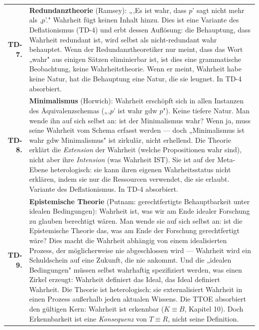 \documentclass[10pt, openany, oneside]{book}
\renewcommand{\footnotesize}{\fontsize{8.5}{11}\selectfont}
\begin{document}
{\footnotesize
\noindent\begin{tabular}{r p{}}
\textbf{TD-7.} & \textbf{Redundanztheorie} (Ramsey): „‚Es ist wahr, dass $p$' sagt nicht mehr als ‚$p$'." Wahrheit fügt keinen Inhalt hinzu. Dies ist eine Variante des Deflationismus (TD-4) und erbt dessen Auflösung: die Behauptung, dass Wahrheit redundant ist, wird selbst als nicht-redundant wahr behauptet. Wenn der Redundanztheoretiker nur meint, dass das Wort „wahr" aus einigen Sätzen eliminierbar ist, ist dies eine grammatische Beobachtung, keine Wahrheitstheorie. Wenn er meint, Wahrheit habe keine Natur, hat die Behauptung eine Natur, die sie leugnet. In TD-4 absorbiert. \\[0.3em]
\textbf{TD-8.} & \textbf{Minimalismus} (Horwich): Wahrheit erschöpft sich in allen Instanzen des Äquivalenzschemas („‚$p$' ist wahr gdw $p$"). Keine tiefere Natur. Man wende ihn auf sich selbst an: ist der Minimalismus wahr? Wenn ja, muss seine Wahrheit vom Schema erfasst werden --- doch „Minimalismus ist wahr gdw Minimalismus" ist zirkulär, nicht erhellend. Die Theorie erklärt die \textit{Extension} der Wahrheit (welche Propositionen wahr sind), nicht aber ihre \textit{Intension} (was Wahrheit IST). Sie ist auf der Meta-Ebene heterologisch: sie kann ihren eigenen Wahrheitsstatus nicht erklären, indem sie nur die Ressourcen verwendet, die sie erlaubt. Variante des Deflationismus. In TD-4 absorbiert. \\[0.3em]
\textbf{TD-9.} & \textbf{Epistemische Theorie} (Putnam: gerechtfertigte Behauptbarkeit unter idealen Bedingungen): Wahrheit ist, was wir am Ende idealer Forschung zu glauben berechtigt wären. Man wende sie auf sich selbst an: ist die Epistemische Theorie das, was am Ende der Forschung gerechtfertigt wäre? Dies macht die Wahrheit abhängig von einem idealisierten Prozess, der möglicherweise nie abgeschlossen wird --- Wahrheit wird ein Schuldschein auf eine Zukunft, die nie ankommt. Und die „idealen Bedingungen" müssen selbst wahrhaftig spezifiziert werden, was einen Zirkel erzeugt: Wahrheit definiert das Ideal, das Ideal definiert Wahrheit. Die Theorie ist heterologisch: sie externalisiert Wahrheit in einen Prozess außerhalb jeden aktualen Wissens. Die TTOE absorbiert den gültigen Kern: Wahrheit ist erkennbar ($K \equiv B$, Kapitel 10). Doch Erkennbarkeit ist eine \textit{Konsequenz} von $T \equiv R$, nicht seine Definition. \\[0.3em]
\end{tabular}
}

\vspace{0.5em}
\end{document}
